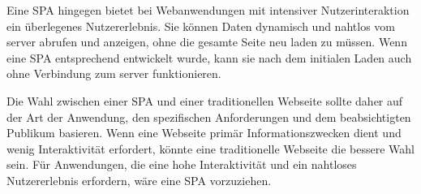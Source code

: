 Eine \ac{SPA} hingegen bietet bei Webanwendungen mit intensiver Nutzerinteraktion ein überlegenes Nutzererlebnis.
Sie können Daten dynamisch und nahtlos vom \gls{server} abrufen und anzeigen, ohne die gesamte Seite neu laden zu müssen.
Wenn eine \ac{SPA} entsprechend entwickelt wurde, kann sie nach dem initialen Laden auch ohne Verbindung zum \gls{server} funktionieren.

Die Wahl zwischen einer \ac{SPA} und einer traditionellen Webseite sollte daher auf der Art der Anwendung, den spezifischen Anforderungen und dem beabsichtigten Publikum basieren.
Wenn eine Webseite primär Informationszwecken dient und wenig Interaktivität erfordert, könnte eine traditionelle Webseite die bessere Wahl sein.
Für Anwendungen, die eine hohe Interaktivität und ein nahtloses Nutzererlebnis erfordern, wäre eine \ac{SPA} vorzuziehen.


